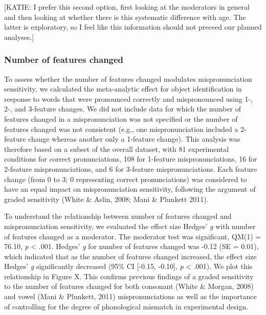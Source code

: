 \documentclass[man]{apa6}
\theoremstyle{definition}
\theoremstyle{definition}
\theoremstyle{definition}
\theoremstyle{remark}
\begin{document}
{[}KATIE: I prefer this second option, first looking at the moderators
in general and then looking at whether there is this systematic
difference with age. The latter is exploratory, so I feel like this
information should not preceed our planned analyses.{]}

\subsubsection{Number of features
changed}\label{number-of-features-changed}

To assess whether the number of features changed modulates
mispronunciation sensitivity, we calculated the meta-analytic effect for
object identification in response to words that were pronounced
correctly and mispronounced using 1-, 2-, and 3-feature changes. We did
not include data for which the number of features changed in a
mispronunciation was not specified or the number of features changed was
not consistent (e.g., one mispronunciation included a 2-feature change
whereas another only a 1-feature change). This analysis was therefore
based on a subset of the overall dataset, with 81 experimental
conditions for correct pronunciations, 108 for 1-feature
mispronunciations, 16 for 2-feature mispronunciations, and 6 for
3-feature mispronunciations. Each feature change (from 0 to 3; 0
representing correct pronunciations) was considered to have an equal
impact on mispronunciation sensitivity, following the argument of graded
sensitivity (White \& Aslin, 2008; Mani \& Plunkett 2011).

To understand the relationship between number of features changed and
mispronunciation sensitivity, we evaluated the effect size Hedges'
\emph{g} with number of features changed as a moderator. The moderator
test was significant, QM(1) = 76.10, \emph{p} \textless{} .001. Hedges'
\emph{g} for number of features changed was -0.12 (SE = 0.01), which
indicated that as the number of features changed increased, the effect
size Hedges' \emph{g} significantly decreased (95\% CI {[}-0.15,
-0.10{]}, \emph{p} \textless{} .001). We plot this relationship in
Figure X. This confirms previous findings of a graded sensitivity to the
number of features changed for both consonant (White \& Morgan, 2008)
and vowel (Mani \& Plunkett, 2011) mispronunciations as well as the
importance of controlling for the degree of phonological mismatch in
experimental design.
\end{document}
